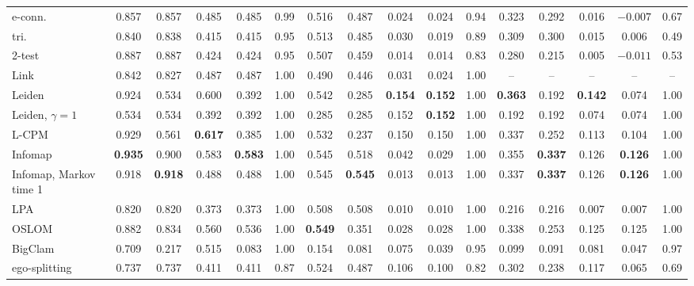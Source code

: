 \begin{table}[t]
\begin{ruledtabular}
\begin{tabular}{lccccccccccccccc}
e-conn. & 0.857 & 0.857 & 0.485 & 0.485 & 0.99 & 0.516 & 0.487 & 0.024 & 0.024 & 0.94 & 0.323 & 0.292 & 0.016 & $-0.007$ & 0.67 \\
tri. & 0.840 & 0.838 & 0.415 & 0.415 & 0.95 & 0.513 & 0.485 & 0.030 & 0.019 & 0.89 & 0.309 & 0.300 & 0.015 & 0.006 & 0.49 \\
2-test & 0.887 & 0.887 & 0.424 & 0.424 & 0.95 & 0.507 & 0.459 & 0.014 & 0.014 & 0.83 & 0.280 & 0.215 & 0.005 & $-0.011$ & 0.53 \\
Link & 0.842 & 0.827 & 0.487 & 0.487 & 1.00 & 0.490 & 0.446 & 0.031 & 0.024 & 1.00 & -- & -- & -- & -- & -- \\
Leiden & 0.924 & 0.534 & 0.600 & 0.392 & 1.00 & 0.542 & 0.285 & \textbf{0.154} & \textbf{0.152} & 1.00 & \textbf{0.363} & 0.192 & \textbf{0.142} & 0.074 & 1.00 \\
Leiden, $\gamma{=}1$ & 0.534 & 0.534 & 0.392 & 0.392 & 1.00 & 0.285 & 0.285 & 0.152 & \textbf{0.152} & 1.00 & 0.192 & 0.192 & 0.074 & 0.074 & 1.00 \\
L-CPM & 0.929 & 0.561 & \textbf{0.617} & 0.385 & 1.00 & 0.532 & 0.237 & 0.150 & 0.150 & 1.00 & 0.337 & 0.252 & 0.113 & 0.104 & 1.00 \\
Infomap & \textbf{0.935} & 0.900 & 0.583 & \textbf{0.583} & 1.00 & 0.545 & 0.518 & 0.042 & 0.029 & 1.00 & 0.355 & \textbf{0.337} & 0.126 & \textbf{0.126} & 1.00 \\
Infomap, Markov time 1 & 0.918 & \textbf{0.918} & 0.488 & 0.488 & 1.00 & 0.545 & \textbf{0.545} & 0.013 & 0.013 & 1.00 & 0.337 & \textbf{0.337} & 0.126 & \textbf{0.126} & 1.00 \\
LPA & 0.820 & 0.820 & 0.373 & 0.373 & 1.00 & 0.508 & 0.508 & 0.010 & 0.010 & 1.00 & 0.216 & 0.216 & 0.007 & 0.007 & 1.00 \\
OSLOM & 0.882 & 0.834 & 0.560 & 0.536 & 1.00 & \textbf{0.549} & 0.351 & 0.028 & 0.028 & 1.00 & 0.338 & 0.253 & 0.125 & 0.125 & 1.00 \\
BigClam & 0.709 & 0.217 & 0.515 & 0.083 & 1.00 & 0.154 & 0.081 & 0.075 & 0.039 & 0.95 & 0.099 & 0.091 & 0.081 & 0.047 & 0.97 \\
ego-splitting & 0.737 & 0.737 & 0.411 & 0.411 & 0.87 & 0.524 & 0.487 & 0.106 & 0.100 & 0.82 & 0.302 & 0.238 & 0.117 & 0.065 & 0.69 \\
\end{tabular}
\end{ruledtabular}
\end{table}
